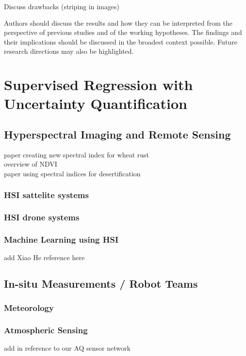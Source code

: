 Discuss drawbacks (striping in images) 

Authors should discuss the results and how they can be interpreted from the perspective of previous studies and of the working hypotheses. The findings and their implications should be discussed in the broadest context possible. Future research directions may also be highlighted.




\section{Supervised Regression with Uncertainty Quantification}

\subsection{Hyperspectral Imaging and Remote Sensing}
paper creating new spectral index for wheat rust \cite{SpectralIndexWheat} \\ 
overview of NDVI \cite{SpectralIndexNDVI} \\ 
paper using spectral indices for desertification \cite{SpectralIndexDesertification}


\subsubsection{HSI sattelite systems}
\subsubsection{HSI drone systems}
\subsubsection{Machine Learning using HSI}
add Xiao He reference here \cite{yu2021pm2}

\subsection{In-situ Measurements / Robot Teams}
\subsubsection{Meteorology}
\subsubsection{Atmospheric Sensing}
add in reference to our AQ sensor network

